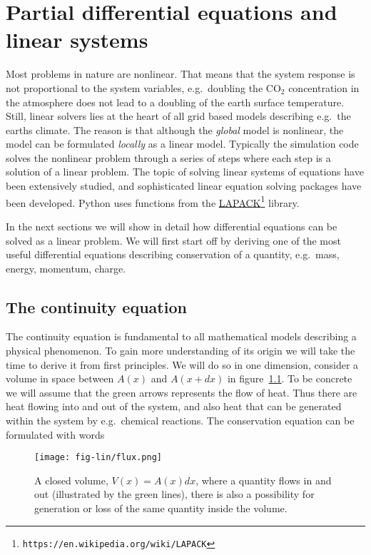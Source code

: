 \documentclass[graybox,sectrefs,envcountresetchap,open=right,final]{svmonodo}
\begin{document}

\chapter{Partial differential equations and linear systems}
\label{ch:lin}
Most problems in nature are nonlinear. That means that the system response is not proportional to the system variables, e.g.~doubling the CO$_2$ concentration in the atmosphere does not lead to a doubling of the earth surface temperature. Still, linear solvers lies at the heart of all grid based models describing e.g.~the earths climate. The reason is that although the \emph{global} model is nonlinear, the model can be formulated \emph{locally} as a linear model. Typically the simulation code solves the nonlinear problem through a series of steps where each step is a solution of a linear problem. The topic of solving linear systems of equations have been extensively studied, and sophisticated linear equation solving packages have been developed. Python uses functions from the \href{{https://en.wikipedia.org/wiki/LAPACK}}{LAPACK}\footnote{\texttt{https://en.wikipedia.org/wiki/LAPACK}} library.

In the next sections we will show in detail how differential equations can be solved as a linear problem. We will first start off by deriving one of the most useful differential equations describing conservation of a quantity, e.g.~mass, energy, momentum, charge.

\section{The continuity equation}
The continuity equation is fundamental to all mathematical models describing a physical phenomenon. To gain more understanding of its origin we will take the time to derive it from first principles. We will do so in one dimension, consider a volume in space between $A(x)$ and $A(x+dx)$ in figure~\ref{fig:lin:flux}. To be concrete we will assume that the green arrows represents the flow of heat. Thus there are heat flowing into and out of the system, and also heat that can be generated within the system by e.g.~chemical reactions. The conservation equation can be formulated with words

\begin{figure}[!ht]  %
  \centerline{\texttt{[image: fig-lin/flux.png]}}
  \caption{
  A closed volume, $V(x)=A(x)dx$, where a quantity flows in and out (illustrated by the green lines), there is also a possibility for generation or loss of the same quantity inside the volume. \label{fig:lin:flux}
  }
\end{figure}
\end{document}
